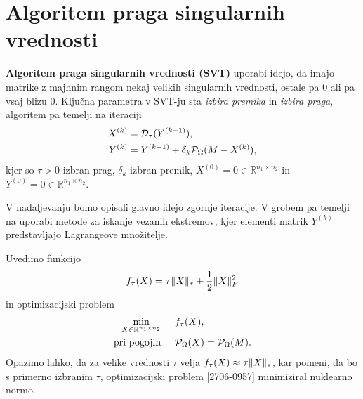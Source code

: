 \section{Algoritem praga singularnih vrednosti}\label{2807-1441}
\textbf{Algoritem praga singularnih vrednosti (SVT)} \cite{CCS} uporabi idejo, da imajo matrike z majhnim rangom nekaj velikih singularnih vrednosti, ostale pa 0 ali pa vsaj blizu 0. Ključna parametra v SVT-ju sta \textit{izbira premika} in \textit{izbira praga},  
algoritem pa temelji na iteraciji
\begin{align}
\label{2407-1910}
        X^{(k)} &= \mathcal{D}_\tau(Y^{(k-1)}), \\
        Y^{(k)} &= Y^{(k-1)} + \delta_k \mathcal{P}_\Omega(M - X^{(k)}), 
\end{align}
kjer so $\tau > 0$ izbran prag, $\delta_k$ izbran premik, $X^{(0)} = 0 \in \mathbb{R}^{n_1 \times n_2}$ in
$Y^{(0)} = 0 \in \mathbb{R}^{n_1 \times n_2}$. 

V nadaljevanju bomo opisali glavno idejo zgornje iteracije. V grobem pa temelji na uporabi metode za iskanje vezanih ekstremov, kjer elementi matrik $Y^{(k)}$ predstavljajo Lagrangeove množitelje. 

Uvedimo funkcijo 
\begin{align}
    \label{1007-2007}
    f_\tau(X) = \tau\lVert X\rVert_* + \frac{1}{2}\lVert X\rVert_F^2
\end{align}
in optimizacijski problem
\begin{align}
\label{2706-0957}
\begin{split}
    \min_{X\in \mathbb R^{n_1\times n_2}} & \hspace{0.5cm} f_\tau(X), \\
    \textrm{pri pogojih} & \hspace{0.5cm} \mathcal{P}_\Omega(X) = \mathcal{P}_\Omega(M).
\end{split}
\end{align}
Opazimo lahko, da za velike vrednosti $\tau$ velja $f_\tau(X) \approx \tau\lVert X\rVert_*$, kar pomeni, da bo s primerno izbranim $\tau$, optimizacijski problem \eqref{2706-0957} minimiziral nuklearno normo.

